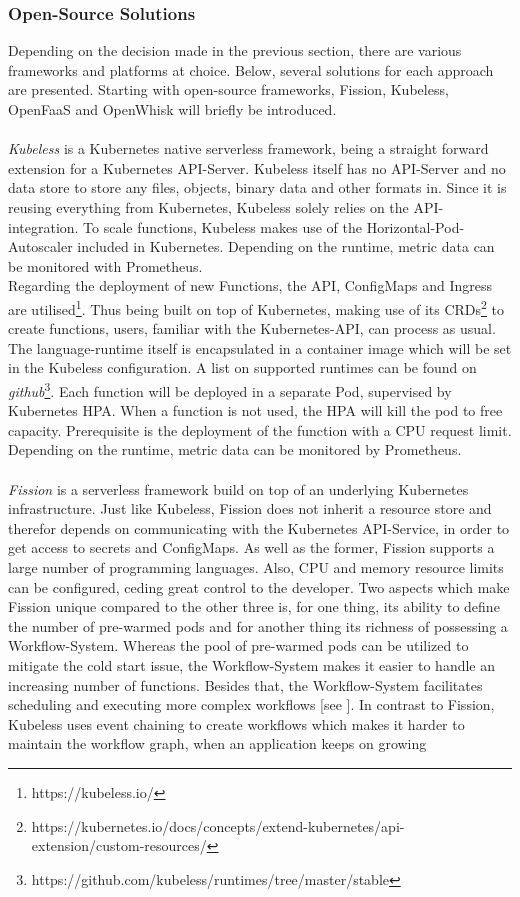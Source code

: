 \documentclass[11pt]{article}
\begin{document}
\subsubsection{Open-Source Solutions}
Depending on the decision made in the previous section, there are various frameworks and platforms at choice. Below, several solutions for each approach are presented. Starting with open-source frameworks, Fission, Kubeless, OpenFaaS and OpenWhisk will briefly be introduced.\\\\ \textit{Kubeless} is a Kubernetes native serverless framework, being a straight forward extension for a Kubernetes API-Server. Kubeless itself has no API-Server and no data store to store any files, objects, binary data and other formats in. Since it is reusing everything from Kubernetes, Kubeless solely relies on the API-integration. To scale functions, Kubeless makes use of the Horizontal-Pod-Autoscaler included in Kubernetes. Depending on the runtime, metric data can be monitored with Prometheus.\\Regarding the deployment of new Functions, the API, ConfigMaps and Ingress are utilised\footnote{https://kubeless.io/}. Thus being built on top of Kubernetes, making use of its CRDs\footnote{https://kubernetes.io/docs/concepts/extend-kubernetes/api-extension/custom-resources/} to create functions, users, familiar with the Kubernetes-API, can process as usual. The language-runtime itself is encapsulated in a container image which will be set in the Kubeless configuration. A list on supported runtimes can be found on \textit{github}\footnote{https://github.com/kubeless/runtimes/tree/master/stable}. Each function will be deployed in a separate Pod, supervised by Kubernetes HPA. When a function is not used, the HPA will kill the pod to free capacity. Prerequisite is the deployment of the function with a CPU request limit. Depending on the runtime, metric data can be monitored by Prometheus.\\\\ \textit{Fission} is a serverless framework build on top of an underlying Kubernetes infrastructure. Just like Kubeless, Fission does not inherit a resource store and therefor depends on communicating with the Kubernetes API-Service, in order to get access to secrets and ConfigMaps. As well as the former, Fission supports a large number of programming languages. Also, CPU and memory resource limits can be configured, ceding great control to the developer. Two aspects which make Fission unique compared to the other three is, for one thing, its ability to define the number of pre-warmed pods and for another thing its richness of possessing a Workflow-System. Whereas the pool of pre-warmed pods can be utilized to mitigate the cold start issue, the Workflow-System makes it easier to handle an increasing number of functions. Besides that, the Workflow-System facilitates scheduling and executing more complex workflows [see \cite{kritikos2018review}]. In contrast to Fission, Kubeless uses event chaining to create workflows which makes it harder to maintain the workflow graph, when an application keeps on growing 
\end{document}
